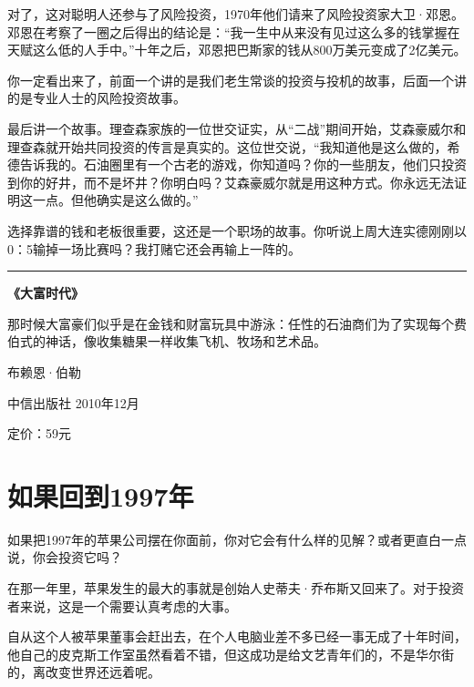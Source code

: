 对了，这对聪明人还参与了风险投资，1970年他们请来了风险投资家大卫·邓恩。邓恩在考察了一圈之后得出的结论是：``我一生中从来没有见过这么多的钱掌握在天赋这么低的人手中。''十年之后，邓恩把巴斯家的钱从800万美元变成了2亿美元。

你一定看出来了，前面一个讲的是我们老生常谈的投资与投机的故事，后面一个讲的是专业人士的风险投资故事。

最后讲一个故事。理查森家族的一位世交证实，从``二战''期间开始，艾森豪威尔和理查森就开始共同投资的传言是真实的。这位世交说，``我知道他是这么做的，希德告诉我的。石油圈里有一个古老的游戏，你知道吗？你的一些朋友，他们只投资到你的好井，而不是坏井？你明白吗？艾森豪威尔就是用这种方式。你永远无法证明这一点。但他确实是这么做的。''

选择靠谱的钱和老板很重要，这还是一个职场的故事。你听说上周大连实德刚刚以0：5输掉一场比赛吗？我打赌它还会再输上一阵的。

\begin{center}\rule{0.5\linewidth}{0.5pt}\end{center}

\textbf{《大富时代》}

那时候大富豪们似乎是在金钱和财富玩具中游泳：任性的石油商们为了实现每个费伯式的神话，像收集糖果一样收集飞机、牧场和艺术品。

布赖恩·伯勒

中信出版社 2010年12月

定价：59元

\hypertarget{ux5982ux679cux56deux52301997ux5e74}{%
\section{如果回到1997年}\label{ux5982ux679cux56deux52301997ux5e74}}

如果把1997年的苹果公司摆在你面前，你对它会有什么样的见解？或者更直白一点说，你会投资它吗？

在那一年里，苹果发生的最大的事就是创始人史蒂夫·乔布斯又回来了。对于投资者来说，这是一个需要认真考虑的大事。

自从这个人被苹果董事会赶出去，在个人电脑业差不多已经一事无成了十年时间，他自己的皮克斯工作室虽然看着不错，但这成功是给文艺青年们的，不是华尔街的，离改变世界还远着呢。

